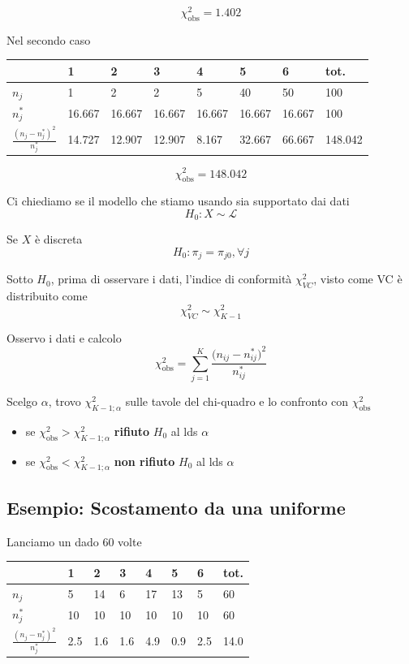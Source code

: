 \documentclass[
  11pt,
]{book}
\providecommand{\tightlist}{%
  \setlength{\itemsep}{0pt}\setlength{\parskip}{0pt}}
\theoremstyle{mytheoremstyle}
\theoremstyle{mydefstyle}
\begin{document}
\[\chi_\text{obs}^2=1.402\]

Nel secondo caso

\begin{tabular}{llllllll}
\toprule
  & 1 & 2 & 3 & 4 & 5 & 6 & tot.\\
\midrule
$n_j$ & 1 & 2 & 2 & 5 & 40 & 50 & 100\\
$n_j^*$ & 16.667 & 16.667 & 16.667 & 16.667 & 16.667 & 16.667 & 100\\
$\frac {(n_j-n_j^*)^2}{n_j^*}$ & 14.727 & 12.907 & 12.907 & 8.167 & 32.667 & 66.667 & 148.042\\
\bottomrule
\end{tabular}

\[\chi_\text{obs}^2=148.042\]

Ci chiediamo se il modello che stiamo usando sia supportato dai dati
\[H_0:X\sim\mathscr{L}\]

Se \(X\) è discreta
\[H_0:\pi_j=\pi_{j0}, \forall j\]

Sotto \(H_0\), prima di osservare i dati, l'indice di conformità \(\chi^2_{VC}\),
visto come VC è distribuito come
\[\chi_{VC}^2\sim\chi^2_{K-1}\]

Osservo i dati e calcolo
\[\chi^2_\text{obs}=\sum_{j=1}^K\frac{\big(n_{ij}-n_{ij}^*\big)^2}{n_{ij}^*}\]

Scelgo \(\alpha\), trovo \(\chi_{K-1;\alpha}^2\) sulle tavole del chi-quadro e lo confronto
con \(\chi^2_\text{obs}\)

\begin{itemize}
\tightlist
\item
  se \(\chi^2_\text{obs}>\chi_{K-1;\alpha}^2\) \textbf{rifiuto} \(H_0\) al lds \(\alpha\)
\item
  se \(\chi^2_\text{obs}<\chi_{K-1;\alpha}^2\) \textbf{non rifiuto} \(H_0\) al lds \(\alpha\)
\end{itemize}

\subsection{Esempio: Scostamento da una uniforme}\label{esempio-scostamento-da-una-uniforme}

Lanciamo un dado 60 volte

\begin{tabular}{llllllll}
\toprule
  & 1 & 2 & 3 & 4 & 5 & 6 & tot.\\
\midrule
$n_j$ & 5 & 14 & 6 & 17 & 13 & 5 & 60\\
$n_j^*$ & 10 & 10 & 10 & 10 & 10 & 10 & 60\\
$\frac {(n_j-n_j^*)^2}{n_j^*}$ & 2.5 & 1.6 & 1.6 & 4.9 & 0.9 & 2.5 & 14.0\\
\bottomrule
\end{tabular}
\end{document}
